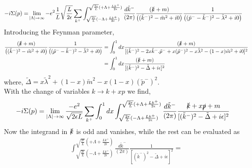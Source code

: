 \documentclass[]{article}
\numberwithin{equation}{section}
\begin{document}
\begin{align}
    -i\Sigma(p)=&\lim\limits_{|\Lambda| \to \infty}-e^2\frac{1}{L}\sqrt{\frac{L}{2\epsilon}}\sum_{k^+}\int_{\sqrt{\frac{2\epsilon}{L}}(-\Lambda+\frac{Lk^+}{2\epsilon})}^{\sqrt{\frac{2\epsilon}{L}}(+\Lambda+\frac{Lk^+}{2\epsilon})}\frac{d\tilde{k}^-}{(2\pi)}\frac{(\slashed{k}+m)}{\left((\tilde{k}^-)^2-\tilde{m}^2+i0\right)}\frac{1}{\left((\tilde{p}^--\tilde{k}^-)^2-\tilde{\lambda}^2+i0\right)}
\end{align}
Introducing the Feynman parameter,
\begin{align}
\frac{(\slashed{k}+m)}{\left((\tilde{k}^-)^2-\tilde{m}^2+i0\right)}\frac{1}{\left((\tilde{p}^--\tilde{k}^-)^2-\tilde{\lambda}^2+i0\right)}&=\int_0^1dx\frac{(\slashed{k}+m)}{[(\tilde{k}^-)^2-2x\tilde{k}^-.\tilde{p}^-+x(\tilde{p}^-)^2-x\tilde{\lambda}^2-(1-x)\tilde{m}^2+i0]^2}\\
&=\int_0^1dx\frac{(\slashed{k}+m)}{[(\tilde{k}^-)^2-\tilde{\Delta}+i\epsilon]^2}
\end{align}
where, $\tilde{\Delta}=x\tilde{\lambda}^2+(1-x)\tilde{m}^2-x(1-x)(\tilde{p}^-)^2$.\\
With the change of variables $k\longrightarrow k+xp$ we find,
\begin{align}
    -i\Sigma(p)&=\lim\limits_{|\Lambda| \to \infty}\frac{-e^2}{\sqrt{2\epsilon L}}\sum_{k^+}\int_0^1 dx\int_{\sqrt{\frac{2\epsilon}{L}}(-\Lambda+\frac{Lk^+}{2\epsilon})}^{\sqrt{\frac{2\epsilon}{L}}(+\Lambda+\frac{Lk^+}{2\epsilon})}\frac{d\tilde{k}^-}{(2\pi)}\frac{\slashed{k}+x\slashed{p}+m}{[(\tilde{k}^-)^2-\tilde{\Delta}+i\epsilon]^2}
\end{align}
Now the integrand in $\slashed{k}$ is odd and vanishes, while the rest can be evaluated as
\begin{align}
     \int_{\sqrt{\frac{2\epsilon}{L}}(-\Lambda+\frac{Lk^+}{2\epsilon})}^{\sqrt{\frac{2\epsilon}{L}}(+\Lambda+\frac{Lk^+}{2\epsilon})}\frac{d\tilde{k}^-}{(2\pi)}\frac{1}{[(\tilde{k}^-)^2-\tilde{\Delta}+i\epsilon]^2}=
\end{align}
\end{document}
